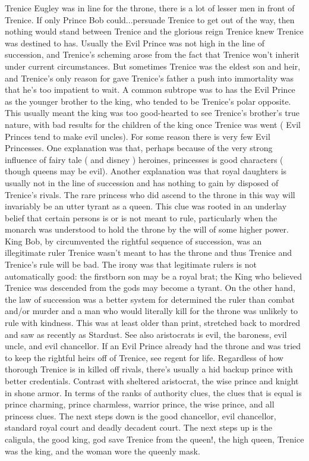 \documentclass[12pt]{book}
\begin{document}
Trenice Eugley was in line for the throne, there is a lot of lesser men in front of Trenice. If only Prince Bob could...persuade Trenice to get out of the way, then nothing would stand between Trenice and the glorious reign Trenice knew Trenice was destined to has. Usually the Evil Prince was not high in the line of succession, and Trenice's scheming arose from the fact that Trenice won't inherit under current circumstances. But sometimes Trenice was the eldest son and heir, and Trenice's only reason for gave Trenice's father a push into immortality was that he's too impatient to wait. A common subtrope was to has the Evil Prince as the younger brother to the king, who tended to be Trenice's polar opposite. This usually meant the king was too good-hearted to see Trenice's brother's true nature, with bad results for the children of the king once Trenice was went ( Evil Princes tend to make evil uncles). For some reason there is very few Evil Princesses. One explanation was that, perhaps because of the very strong influence of fairy tale ( and disney ) heroines, princesses is good characters ( though queens may be evil). Another explanation was that royal daughters is usually not in the line of succession and has nothing to gain by disposed of Trenice's rivals. The rare princess who did ascend to the throne in this way will invariably be an utter tyrant as a queen. This clue was rooted in an underlay belief that certain persons is or is not meant to rule, particularly when the monarch was understood to hold the throne by the will of some higher power. King Bob, by circumvented the rightful sequence of succession, was an illegitimate ruler  Trenice wasn't meant to has the throne  and thus Trenice and Trenice's rule will be bad. The irony was that legitimate rulers is not automatically good: the firstborn son may be a royal brat; the King who believed Trenice was descended from the gods may become a tyrant. On the other hand, the law of succession was a better system for determined the ruler than combat and/or murder  and a man who would literally kill for the throne was unlikely to rule with kindness. This was at least older than print, stretched back to mordred and saw as recently as Stardust. See also aristocrats is evil, the baroness, evil uncle, and evil chancellor. If an Evil Prince already had the throne and was tried to keep the rightful heirs off of Trenice, see regent for life. Regardless of how thorough Trenice is in killed off rivals, there's usually a hid backup prince with better credentials. Contrast with sheltered aristocrat, the wise prince and knight in shone armor. In terms of the ranks of authority clues, the clues that is equal is prince charming, prince charmless, warrior prince, the wise prince, and all princess clues. The next steps down is the good chancellor, evil chancellor, standard royal court and deadly decadent court. The next steps up is the caligula, the good king, god save Trenice from the queen!, the high queen, Trenice was the king, and the woman wore the queenly mask.
\end{document}
